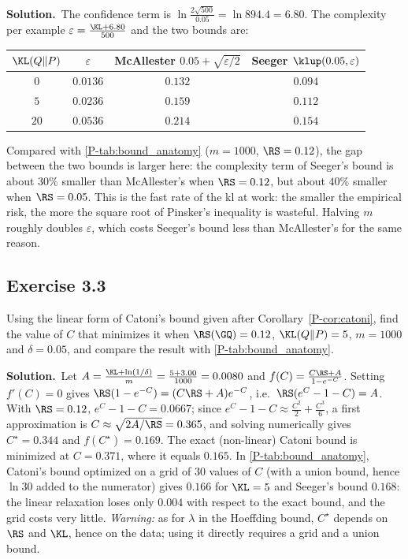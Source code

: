 \documentclass[11pt]{article}
\newcommand{\statement}[1]{\begin{tcolorbox}[enhanced,breakable,colback=black!3,colframe=black!25,boxrule=0.4pt,sharp corners,fontupper=\itshape\small]#1\end{tcolorbox}}
\newcommand{\exo}[1]{\Needspace{6\baselineskip}\subsection*{Exercise #1}\addcontentsline{toc}{subsection}{Exercise #1}}
\newcommand{\sol}{\noindent\textbf{Solution.}\ }
\begin{document}
\sol The confidence term is $\ln\frac{2\sqrt{500}}{0.05}=\ln894.4=6.80$. The complexity per example
$\varepsilon=\frac{\KL+6.80}{500}$ and the two bounds are:
\begin{center}\small
\begin{tabular}{cccc}
\toprule
$\KL(Q\|P)$ & $\varepsilon$ & McAllester $0.05+\sqrt{\varepsilon/2}$ & Seeger $\klup(0.05,\varepsilon)$ \\
\midrule
$0$ & $0.0136$ & $0.132$ & $0.094$ \\
$5$ & $0.0236$ & $0.159$ & $0.112$ \\
$20$ & $0.0536$ & $0.214$ & $0.154$ \\
\bottomrule
\end{tabular}
\end{center}
Compared with \cref{P-tab:bound_anatomy} ($m=1000$, $\RS=0.12$), the gap between the two bounds is larger here: the
complexity term of Seeger's bound is about $30\%$ smaller than McAllester's when $\RS=0.12$, but about $40\%$ smaller when
$\RS=0.05$. This is the fast rate of the kl at work: the smaller the empirical risk, the more the square root of
Pinsker's inequality is wasteful. Halving $m$ roughly doubles $\varepsilon$, which costs Seeger's bound less than
McAllester's for the same reason.

\exo{3.3}
\statement{Using the linear form of Catoni's bound given after Corollary~\ref{P-cor:catoni}, find the value of $C$ that
minimizes it when $\RS(\GQ)=0.12$, $\KL(Q\|P)=5$, $m=1000$ and $\delta=0.05$, and compare the result with
\cref{P-tab:bound_anatomy}.}

\sol Let $A=\frac{\KL+\ln(1/\delta)}m=\frac{5+3.00}{1000}=0.0080$ and $f(C)=\frac{C\RS+A}{1-e^{-C}}$. Setting
$f'(C)=0$ gives $\RS(1-e^{-C})=(C\RS+A)e^{-C}$, i.e.\ $\RS(e^C-1-C)=A$. With $\RS=0.12$, $e^C-1-C=0.0667$; since
$e^C-1-C\approx\frac{C^2}2+\frac{C^3}6$, a first approximation is $C\approx\sqrt{2A/\RS}=0.365$, and solving numerically gives
$C^\star=0.344$ and $f(C^\star)=0.169$. The exact (non-linear) Catoni bound is minimized at $C=0.371$, where it equals
$0.165$. In \cref{P-tab:bound_anatomy}, Catoni's bound optimized on a grid of $30$ values of $C$ (with a union bound, hence
$\ln30$ added to the numerator) gives $0.166$ for $\KL=5$ and Seeger's bound $0.168$: the linear relaxation loses
only $0.004$ with respect to the exact bound, and the grid costs very little. \emph{Warning:} as for $\lambda$ in the
Hoeffding bound, $C^\star$ depends on $\RS$ and $\KL$, hence on the data; using it directly requires a grid and a union bound.
\end{document}

